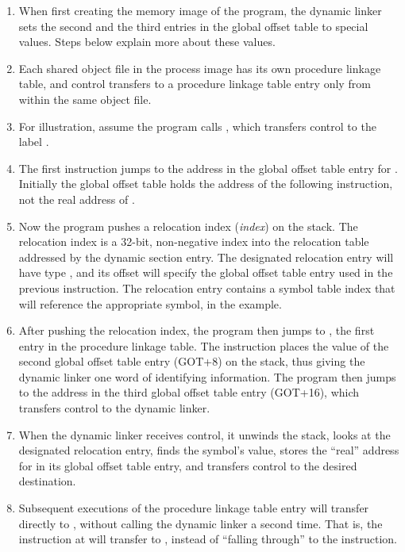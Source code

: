 \begin{enumerate}
\item When first creating the memory image of the program, the dynamic
  linker sets the second and the third entries in the global offset
  table to special values.  Steps below explain more about these
  values.
\item Each shared object file in the process image has its own
  procedure linkage table, and control transfers to a procedure
  linkage table entry only from within the same object file.
\item For illustration, assume the program calls , which
  transfers control to the label .
\item The first instruction jumps to the address in the global offset
  table entry for .  Initially the global offset table
  holds the address of the following  instruction, not the
  real address of .
\item Now the program pushes a relocation index (\textit{index}) on
  the stack. The relocation index is a 32-bit, non-negative index into
  the relocation table addressed by the  dynamic
  section entry.  The designated relocation entry will have type
  , and its offset will specify the
  global offset table entry used in the previous 
  instruction.  The relocation entry contains a symbol table index
  that will reference the appropriate symbol,  in the
  example.
\item After pushing the relocation index, the program then jumps to
  , the first entry in the procedure linkage table.  The
   instruction places the value of the second global
  offset table entry (GOT+8) on the stack, thus giving the dynamic
  linker one word of identifying information.  The program then jumps
  to the address in the third global offset table entry (GOT+16),
  which transfers control to the dynamic linker.
\item When the dynamic linker receives control, it unwinds the stack,
  looks at the designated relocation entry, finds the symbol's value,
  stores the ``real'' address for  in its global offset
  table entry, and transfers control to the desired destination.
\item Subsequent executions of the procedure linkage table entry will
  transfer directly to , without calling the dynamic
  linker a second time.  That is, the  instruction at
   will transfer to , instead of ``falling
  through'' to the  instruction.
\end{enumerate}

